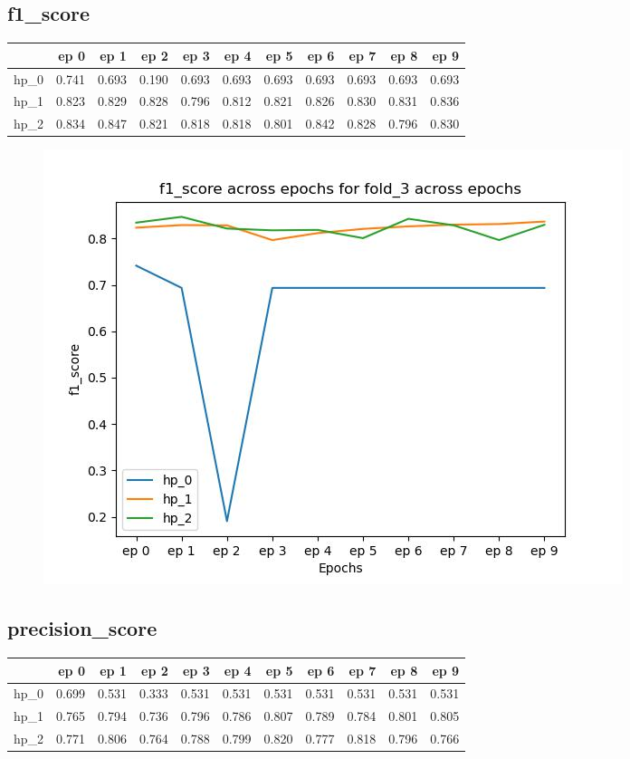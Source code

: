 \documentclass{article}
\begin{document}
\subsection{f1\_score}
\begin{tabular}{lrrrrrrrrrr}
\toprule
{} &   ep 0 &   ep 1 &   ep 2 &   ep 3 &   ep 4 &   ep 5 &   ep 6 &   ep 7 &   ep 8 &   ep 9 \\
\midrule
hp\_0 &  0.741 &  0.693 &  0.190 &  0.693 &  0.693 &  0.693 &  0.693 &  0.693 &  0.693 &  0.693 \\
hp\_1 &  0.823 &  0.829 &  0.828 &  0.796 &  0.812 &  0.821 &  0.826 &  0.830 &  0.831 &  0.836 \\
hp\_2 &  0.834 &  0.847 &  0.821 &  0.818 &  0.818 &  0.801 &  0.842 &  0.828 &  0.796 &  0.830 \\
\bottomrule
\end{tabular}

\begin{figure}[H]
\includegraphics[scale = 0.75]{fold_3/f1_score}
\end{figure}
\subsection{precision\_score}
\begin{tabular}{lrrrrrrrrrr}
\toprule
{} &   ep 0 &   ep 1 &   ep 2 &   ep 3 &   ep 4 &   ep 5 &   ep 6 &   ep 7 &   ep 8 &   ep 9 \\
\midrule
hp\_0 &  0.699 &  0.531 &  0.333 &  0.531 &  0.531 &  0.531 &  0.531 &  0.531 &  0.531 &  0.531 \\
hp\_1 &  0.765 &  0.794 &  0.736 &  0.796 &  0.786 &  0.807 &  0.789 &  0.784 &  0.801 &  0.805 \\
hp\_2 &  0.771 &  0.806 &  0.764 &  0.788 &  0.799 &  0.820 &  0.777 &  0.818 &  0.796 &  0.766 \\
\bottomrule
\end{tabular}
\end{document}
